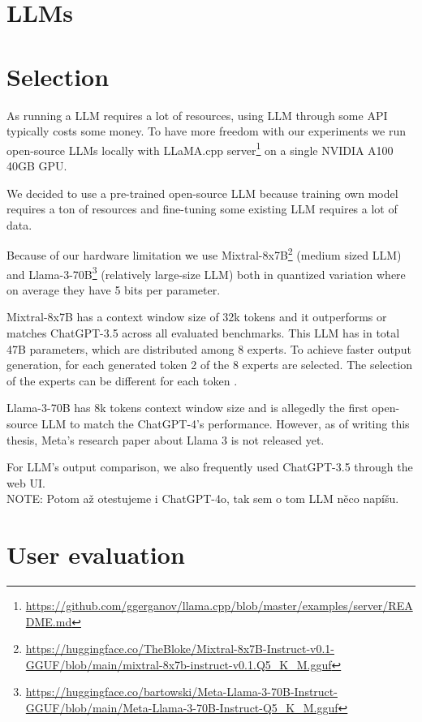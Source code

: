\section{LLMs}

\section{Selection}

As running a LLM requires a lot of resources, using LLM through some API typically costs some money. To have more freedom with our experiments we run open-source LLMs locally with LLaMA.cpp server\footnote{\url{https://github.com/ggerganov/llama.cpp/blob/master/examples/server/README.md}} on a single NVIDIA A100 40GB GPU.

We decided to use a pre-trained open-source LLM because training own model requires a ton of resources and fine-tuning some existing LLM requires a lot of data.

Because of our hardware limitation we use Mixtral-8x7B\footnote{\url{https://huggingface.co/TheBloke/Mixtral-8x7B-Instruct-v0.1-GGUF/blob/main/mixtral-8x7b-instruct-v0.1.Q5_K_M.gguf}} (medium sized LLM) \cite{Jiang2024} and Llama-3-70B\footnote{\url{https://huggingface.co/bartowski/Meta-Llama-3-70B-Instruct-GGUF/blob/main/Meta-Llama-3-70B-Instruct-Q5_K_M.gguf}} (relatively large-size LLM) both in quantized variation where on average they have 5 bits per parameter.

Mixtral-8x7B has a context window size of 32k tokens and it outperforms or matches ChatGPT-3.5 across all evaluated benchmarks. This LLM has in total 47B parameters, which are distributed among 8 experts. To achieve faster output generation, for each generated token 2 of the 8 experts are selected. The selection of the experts can be different for each token \cite{Jiang2024}.

Llama-3-70B has 8k tokens context window size and is allegedly  the first open-source LLM to match the ChatGPT-4's performance. However, as of writing this thesis, Meta's research paper about Llama 3 is not released yet.

For LLM's output comparison, we also frequently used ChatGPT-3.5 through the web UI. \\

NOTE: Potom až otestujeme i ChatGPT-4o, tak sem o tom LLM něco napíšu. \\


\section{User evaluation}

